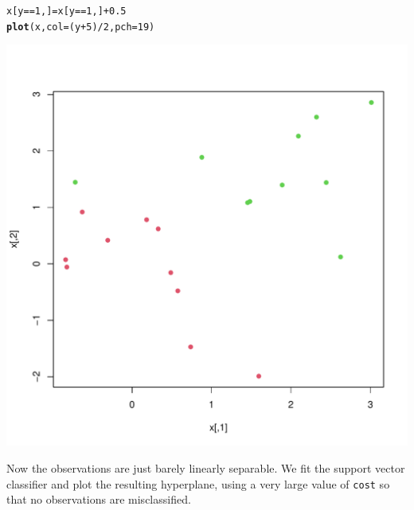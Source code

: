 \documentclass[12pt]{article}\usepackage[]{graphicx}\usepackage[]{color}
\makeatletter
\def\maxwidth{ %
  \ifdim\Gin@nat@width>\linewidth
    \linewidth
  \else
    \Gin@nat@width
  \fi
}
\newcommand{\hlnum}[1]{\textcolor[rgb]{0.686,0.059,0.569}{#1}}%
\newcommand{\hlopt}[1]{\textcolor[rgb]{0,0,0}{#1}}%
\newcommand{\hlstd}[1]{\textcolor[rgb]{0.345,0.345,0.345}{#1}}%
\newcommand{\hlkwb}[1]{\textcolor[rgb]{0.69,0.353,0.396}{#1}}%
\newcommand{\hlkwc}[1]{\textcolor[rgb]{0.333,0.667,0.333}{#1}}%
\newcommand{\hlkwd}[1]{\textcolor[rgb]{0.737,0.353,0.396}{\textbf{#1}}}%
\newenvironment{kframe}{%
 \def\at@end@of@kframe{}%
 \ifinner\ifhmode%
  \def\at@end@of@kframe{\end{minipage}}%
  \begin{minipage}{\columnwidth}%
 \fi\fi%
 \def\FrameCommand##1{\hskip\@totalleftmargin \hskip-\fboxsep
 \colorbox{shadecolor}{##1}\hskip-\fboxsep
     \hskip-\linewidth \hskip-\@totalleftmargin \hskip\columnwidth}%
 \MakeFramed {\advance\hsize-\width
   \@totalleftmargin\z@ \linewidth\hsize
   \@setminipage}}%
 {\par\unskip\endMakeFramed%
 \at@end@of@kframe}
\newenvironment{knitrout}{}{} %
\makeatother
\begin{document}
\begin{knitrout}
\color{fgcolor}\begin{kframe}
\begin{alltt}
\hlstd{x[y}\hlopt{==}\hlnum{1}\hlstd{,]}\hlkwb{=}\hlstd{x[y}\hlopt{==}\hlnum{1}\hlstd{,]}\hlopt{+}\hlnum{0.5}
\hlkwd{plot}\hlstd{(x,} \hlkwc{col}\hlstd{=(y}\hlopt{+}\hlnum{5}\hlstd{)}\hlopt{/}\hlnum{2}\hlstd{,} \hlkwc{pch}\hlstd{=}\hlnum{19}\hlstd{)}
\end{alltt}
\end{kframe}
\includegraphics[width=\maxwidth]{figure/unnamed-chunk-14-1} 

\end{knitrout}

Now the observations are just barely linearly separable. We fit the support vector classifier and plot the resulting hyperplane, using a very large value of \texttt{cost} so that no observations are misclassified.
\end{document}
